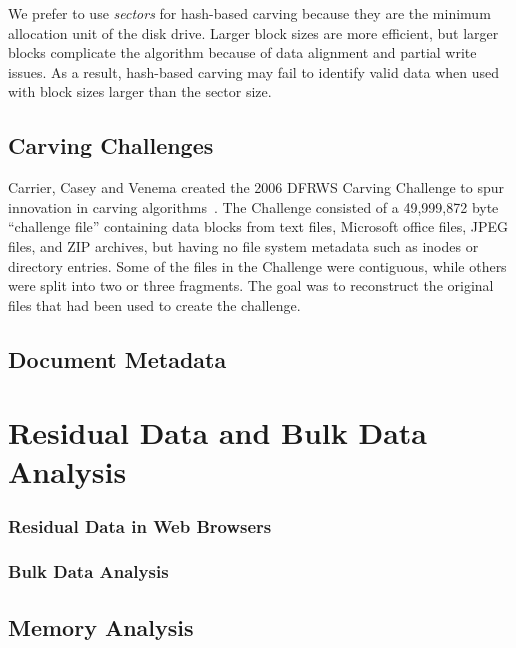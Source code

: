 \documentclass[11pt,letter]{article}
\begin{document}
We prefer to use \emph{sectors} for hash-based
carving because they are the minimum allocation unit of the disk
drive. Larger block sizes are more efficient, but larger blocks
complicate the algorithm because of data alignment and partial write
issues. As a result, hash-based carving may fail to identify valid
data when used with block sizes larger than the sector size.


\section{Carving Challenges}

Carrier, Casey and Venema created the 2006 DFRWS Carving Challenge
to spur innovation in carving
algorithms~\cite{dfrws2006-challenge}. The Challenge consisted of a
49,999,872 byte ``challenge file'' containing data blocks from text
files, Microsoft office files, JPEG files, and ZIP 
archives, but having no file system metadata such as inodes or
directory entries. Some of the files in the Challenge were
contiguous, while others were split into two or three fragments. The
goal was to reconstruct the original files
that had been used to create the challenge. 




\setcounter{chapter}{5}        %
\section{Document Metadata}
\chapter{Residual Data and Bulk Data Analysis}


\subsection{Residual Data in Web Browsers}
\cite{dfrws2011:JunghoonOhAndSeungbongLeeAndSangjinLee}

\subsection{Bulk Data Analysis}

\cite{dfrws2011:RobertBeverlyAndSimsonGarfinkelAndGregCardwell}
\cite{dfrws2011:RalfBrown}


\section{Memory Analysis}
\cite{dfrws2011:JamesOkolicaAndGilbertPeterson}
 
\end{document}
